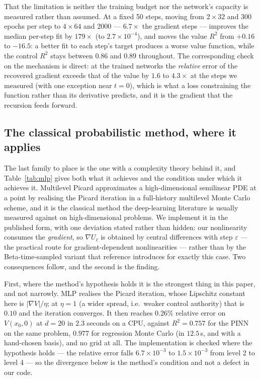 \documentclass[conference]{IEEEtran}
\begin{document}
That the limitation is neither the training budget nor the network's capacity is measured rather than
assumed. At a fixed 50 steps, moving from $2\times32$ and 300 epochs per step to $4\times64$ and 2000
--- $6.7\times$ the gradient steps --- improves the median per-step fit by $179\times$ (to
$2.7\times10^{-4}$), and moves the value $R^2$ from $+0.16$ to $-16.5$: a better fit to each step's
target produces a worse value function, while the control $R^2$ stays between $0.86$ and $0.89$
throughout. The corresponding check on the mechanism is direct: at the trained networks the
\emph{relative} error of the recovered gradient exceeds that of the value by $1.6$ to $4.3\times$ at
the steps we measured (with one exception near $t=0$), which is what a loss constraining the function
rather than its derivative predicts, and it is the gradient that the recursion feeds forward.

\subsection{The classical probabilistic method, where it applies}\label{sec:mlp}

The last family to place is the one with a complexity theory behind it, and
Table~\ref{tab:mlp} gives both what it achieves and the condition under which it achieves it.
Multilevel Picard
\cite{hutzenthaler2020multilevel,hutzenthaler2022overcoming} approximates a high-dimensional semilinear PDE at a point by
realising the Picard iteration in a full-history multilevel Monte Carlo scheme, and it is the classical
method the deep-learning literature is usually measured against on high-dimensional problems. We
implement it in the published form, with one deviation stated rather than hidden: our nonlinearity
consumes the \emph{gradient}, so $\nabla U_\ell$ is obtained by central differences with step
$\varepsilon$ --- the practical route for gradient-dependent nonlinearities
\cite{neufeld2023multilevel} --- rather than by the Beta-time-sampled variant that reference
introduces for exactly this case. Two consequences follow, and the second is the finding.



First, where the method's hypothesis holds it is the strongest thing in this paper, and not narrowly.
MLP realises the Picard iteration, whose Lipschitz constant here is $|\nabla V|/\eta$; at $\eta = 1$
(a wider spread, i.e.\ weaker control authority) that is $0.10$ and the iteration converges. It then
reaches $0.26\%$ relative error on $V(x_0,0)$ at $d = 20$ in $2.3$ seconds on a CPU, against
$R^2 = 0.757$ for the PINN on the same problem, $0.977$ for regression Monte Carlo (in $12.5$\,s, and
with a hand-chosen basis), and no grid at all. The implementation is checked where the hypothesis
holds --- the relative error falls $6.7\times10^{-3}$ to $1.5\times10^{-3}$ from level 2 to level 4 ---
so the divergence below is the method's condition and not a defect in our code.
\end{document}
